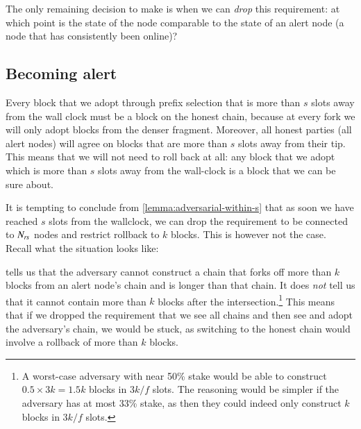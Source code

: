 The only remaining decision to make is when we can \emph{drop} this requirement:
at which point is the state of the node comparable to the state of an alert node
(a node that has consistently been online)?

\subsection{Becoming alert}
\label{genesis:becoming-alert}

Every block that we adopt through prefix selection that is more than $s$ slots
away from the wall clock must be a block on the honest chain, because at every
fork we will only adopt blocks from the denser fragment. Moreover, all honest
parties (all alert nodes) will agree on blocks that are more than $s$ slots away
from their tip. This means that we will not need to roll back at all: any block
that we adopt which is more than $s$ slots away from the wall-clock is a block
that we can be sure about.

\pagebreak

It is tempting to conclude from \cref{lemma:adversarial-within-s} that as soon
we have reached $s$ slots from the wallclock, we can drop the requirement to be
connected to $N_\mathit{rs}$ nodes and restrict rollback to  $k$ blocks. This
is however not the case. Recall what the situation looks like:
%
\begin{center}
\end{center}
%
 tells us that the adversary cannot construct a
chain that forks off more than $k$ blocks from an alert node's chain and is
longer than that chain. It does \emph{not} tell us that it cannot contain more
than $k$  blocks after the intersection.\footnote{A worst-case adversary with
near 50\% stake would be able to construct $0.5 \times 3k = 1.5k$ blocks in
$3k/f$ slots. The reasoning would be simpler if the adversary has at most 33\%
stake, as then they could indeed only construct $k$ blocks in $3k/f$ slots.}
This means that if we dropped the requirement that we see all chains and then
see and adopt the adversary's chain, we would be stuck, as switching to the
honest chain would involve a rollback of more than $k$ blocks.


